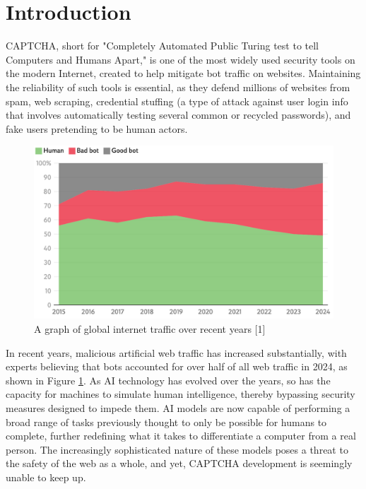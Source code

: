 \documentclass[sigplan,screen,nonacm]{acmart-tagged}
\begin{document}
\section{Introduction}
\label{sec:introduction}

CAPTCHA, short for "Completely Automated Public Turing test to tell Computers and Humans Apart," is one of the most widely used security tools on the modern Internet, created to help mitigate bot traffic on websites. Maintaining the reliability of such tools is essential, as they defend millions of websites from spam, web scraping, credential stuffing (a type of attack against user login info that involves automatically testing several common or recycled passwords), and fake users pretending to be human actors.

\begin{figure}[h]
\centering
\includegraphics[width=1\linewidth]{resources/bots}
\caption{A graph of global internet traffic over recent years [1]}
\label{fig:bots}
\end{figure}


In recent years, malicious artificial web traffic has increased substantially, with experts believing that bots accounted for over half of all web traffic in 2024, as shown in Figure \ref{fig:bots}. As AI technology has evolved over the years, so has the capacity for machines to simulate human intelligence, thereby bypassing security measures designed to impede them. AI models are now capable of performing a broad range of tasks previously thought to only be possible for humans to complete, further redefining what it takes to differentiate a computer from a real person. The increasingly sophisticated nature of these models poses a threat to the safety of the web as a whole, and yet, CAPTCHA development is seemingly unable to keep up.
\end{document}
